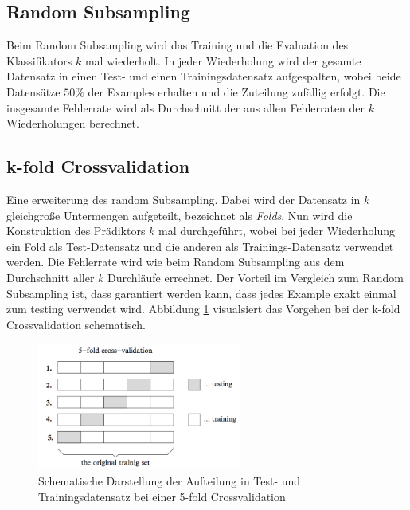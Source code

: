 \subsection*{Random Subsampling}

Beim Random Subsampling wird das Training und die Evaluation des Klassifikators $k$ mal wiederholt. In jeder Wiederholung wird der gesamte Datensatz in einen Test- und einen Trainingsdatensatz aufgespalten, wobei beide Datensätze $50 \%$ der Examples erhalten und die Zuteilung zufällig erfolgt. Die insgesamte Fehlerrate wird als Durchschnitt der aus allen Fehlerraten der $k$ Wiederholungen berechnet. \cite[S. 227 - 228]{machine_kubat}

\subsection{k-fold Crossvalidation}

Eine erweiterung des random Subsampling. Dabei wird der Datensatz in $k$ gleichgroße Untermengen aufgeteilt, bezeichnet als \emph{Folds}. Nun wird die Konstruktion des Prädiktors $k$ mal durchgeführt, wobei bei jeder Wiederholung ein Fold als Test-Datensatz und die anderen als Trainings-Datensatz verwendet werden. Die Fehlerrate wird wie beim Random Subsampling aus dem Durchschnitt aller $k$ Durchläufe errechnet. Der Vorteil im Vergleich zum Random Subsampling ist, dass garantiert werden kann, dass jedes Example exakt einmal zum testing verwendet wird. Abbildung \ref{k-Fold-Crossvalidation} visualsiert das Vorgehen bei der  k-fold Crossvalidation schematisch. \cite[S. 228]{machine_kubat}

\begin{figure}[h]
	\centering
	\includegraphics[width=0.6\textwidth]{bilder/k-Fold-Crossvalidation.png}
	\caption{Schematische Darstellung der Aufteilung in Test- und Trainingsdatensatz bei einer 5-fold Crossvalidation}
	\label{k-Fold-Crossvalidation}
\end{figure}



